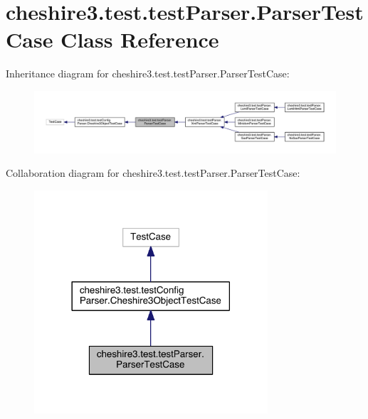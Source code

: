 \hypertarget{classcheshire3_1_1test_1_1test_parser_1_1_parser_test_case}{\section{cheshire3.\-test.\-test\-Parser.\-Parser\-Test\-Case Class Reference}
\label{classcheshire3_1_1test_1_1test_parser_1_1_parser_test_case}
}


Inheritance diagram for cheshire3.\-test.\-test\-Parser.\-Parser\-Test\-Case\-:
\nopagebreak
\begin{figure}[H]
\begin{center}
\leavevmode
\includegraphics[width=350pt]{classcheshire3_1_1test_1_1test_parser_1_1_parser_test_case__inherit__graph}
\end{center}
\end{figure}


Collaboration diagram for cheshire3.\-test.\-test\-Parser.\-Parser\-Test\-Case\-:
\nopagebreak
\begin{figure}[H]
\begin{center}
\leavevmode
\includegraphics[width=246pt]{classcheshire3_1_1test_1_1test_parser_1_1_parser_test_case__coll__graph}
\end{center}
\end{figure}
